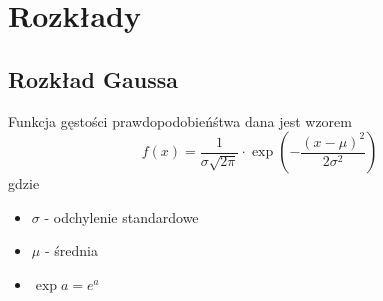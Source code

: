 \section*{Rozkłady}

\subsection*{Rozkład Gaussa}

Funkcja gęstości prawdopodobieńśtwa dana jest wzorem
\begin{equation*}
    f(x) = \frac{1 }{\sigma \sqrt{2\pi}} \cdot 
    \exp{\left(-\frac{(x-\mu)^2}{2\sigma^2}\right)}
\end{equation*}
gdzie
\begin{itemize}
    \item $\sigma$ - odchylenie standardowe
    \item $\mu$ - średnia
    \item $\exp{a} = e^a$
\end{itemize}